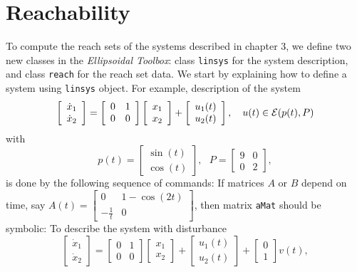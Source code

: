 \section{Reachability}
To compute the reach sets of the systems described in chapter 3, we define
two new classes in the {\it Ellipsoidal Toolbox}: class {\tt linsys} for the
system description, and class {\tt reach} for the reach set data.
We start by explaining how to define a system using {\tt linsys} object.
For example, description of the system
\[ \left[\begin{array}{cc}
\dot{x}_1\\
\dot{x}_2\end{array}\right] = \left[\begin{array}{cc}
0 & 1\\
0 & 0\end{array}\right]\left[\begin{array}{c}
x_1\\
x_2\end{array}\right] + \left[\begin{array}{c}
u_1(t)\\
u_2(t)\end{array}\right], ~~~ u(t)\in\EE(p(t), P) \]
with
\[ p(t) = \left[\begin{array}{c}
\sin(t)\\
\cos(t)\end{array}\right], ~~~ P = \left[\begin{array}{cc}
9 & 0\\
0 & 2\end{array}\right], \]
is done by the following sequence of commands:
If matrices $A$ or $B$ depend on time, say $A(t)=\left[\begin{array}{cc}
0 & 1-\cos(2t)\\
-\frac{1}{t} & 0\end{array}\right]$, then matrix {\tt aMat} should be symbolic:
To describe the system with disturbance
\[ \left[\begin{array}{cc}
\dot{x}_1\\
\dot{x}_2\end{array}\right] = \left[\begin{array}{cc}
0 & 1\\
0 & 0\end{array}\right]\left[\begin{array}{c}
x_1\\
x_2\end{array}\right] + \left[\begin{array}{c}
u_1(t)\\
u_2(t)\end{array}\right] + \left[\begin{array}{c}
0\\
1\end{array}\right]v(t), \]
